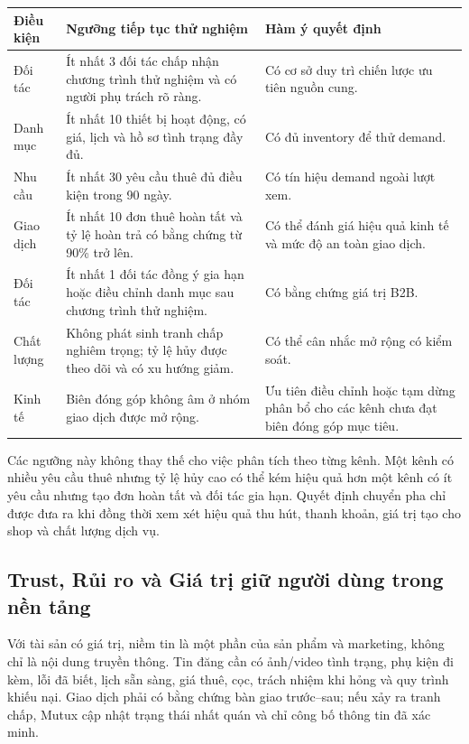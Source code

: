 \begin{longtable}{@{}p{}p{}p{}@{}}
\toprule
\textbf{Điều kiện} & \textbf{Ngưỡng tiếp tục thử nghiệm} & \textbf{Hàm ý quyết định} \\
\midrule
\endhead
Đối tác & Ít nhất 3 đối tác chấp nhận chương trình thử nghiệm và có người phụ trách rõ ràng. & Có cơ sở duy trì chiến lược ưu tiên nguồn cung. \\
Danh mục & Ít nhất 10 thiết bị hoạt động, có giá, lịch và hồ sơ tình trạng đầy đủ. & Có đủ inventory để thử demand. \\
Nhu cầu & Ít nhất 30 yêu cầu thuê đủ điều kiện trong 90 ngày. & Có tín hiệu demand ngoài lượt xem. \\
Giao dịch & Ít nhất 10 đơn thuê hoàn tất và tỷ lệ hoàn trả có bằng chứng từ 90\% trở lên. & Có thể đánh giá hiệu quả kinh tế và mức độ an toàn giao dịch. \\
Đối tác & Ít nhất 1 đối tác đồng ý gia hạn hoặc điều chỉnh danh mục sau chương trình thử nghiệm. & Có bằng chứng giá trị B2B. \\
Chất lượng & Không phát sinh tranh chấp nghiêm trọng; tỷ lệ hủy được theo dõi và có xu hướng giảm. & Có thể cân nhắc mở rộng có kiểm soát. \\
Kinh tế & Biên đóng góp không âm ở nhóm giao dịch được mở rộng. & Ưu tiên điều chỉnh hoặc tạm dừng phân bổ cho các kênh chưa đạt biên đóng góp mục tiêu. \\
\bottomrule
\end{longtable}

Các ngưỡng này không thay thế cho việc phân tích theo từng kênh. Một kênh có nhiều yêu cầu thuê nhưng tỷ lệ hủy cao có thể kém hiệu quả hơn một kênh có ít yêu cầu nhưng tạo đơn hoàn tất và đối tác gia hạn. Quyết định chuyển pha chỉ được đưa ra khi đồng thời xem xét hiệu quả thu hút, thanh khoản, giá trị tạo cho shop và chất lượng dịch vụ.

\subsection{Trust, Rủi ro và Giá trị giữ người dùng trong nền tảng}

Với tài sản có giá trị, niềm tin là một phần của sản phẩm và marketing, không chỉ là nội dung truyền thông. Tin đăng cần có ảnh/video tình trạng, phụ kiện đi kèm, lỗi đã biết, lịch sẵn sàng, giá thuê, cọc, trách nhiệm khi hỏng và quy trình khiếu nại. Giao dịch phải có bằng chứng bàn giao trước--sau; nếu xảy ra tranh chấp, Mutux cập nhật trạng thái nhất quán và chỉ công bố thông tin đã xác minh.

